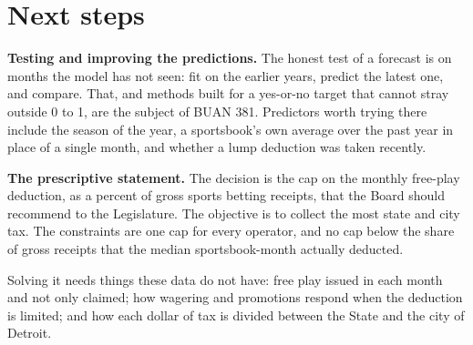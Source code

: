 \section{Next steps}\label{sec:next}

\textbf{Testing and improving the predictions.} The honest test of a forecast is on months the model has not seen: fit on the earlier years, predict the latest one, and compare. That, and methods built for a yes-or-no target that cannot stray outside 0 to 1, are the subject of BUAN 381. Predictors worth trying there include the season of the year, a sportsbook's own average over the past year in place of a single month, and whether a lump deduction was taken recently.

\textbf{The prescriptive statement.} The decision is the cap on the monthly free-play deduction, as a percent of gross sports betting receipts, that the Board should recommend to the Legislature. The objective is to collect the most state and city tax. The constraints are one cap for every operator, and no cap below the share of gross receipts that the median sportsbook-month actually deducted.

Solving it needs things these data do not have: free play issued in each month and not only claimed; how wagering and promotions respond when the deduction is limited; and how each dollar of tax is divided between the State and the city of Detroit.
